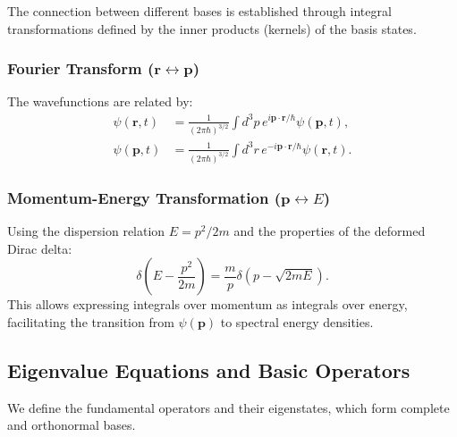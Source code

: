 The connection between different bases is established through integral transformations defined by the inner products (kernels) of the basis states.

\subsubsection{Fourier Transform ($\mathbf{r} \leftrightarrow \mathbf{p}$)}
The wavefunctions are related by:
\begin{align}
    \psi(\mathbf{r},t) &= \frac{1}{(2\pi\hbar)^{3/2}} \int d^3p \, e^{i\mathbf{p}\cdot\mathbf{r}/\hbar} \psi(\mathbf{p},t), \\
    \psi(\mathbf{p},t) &= \frac{1}{(2\pi\hbar)^{3/2}} \int d^3r \, e^{-i\mathbf{p}\cdot\mathbf{r}/\hbar} \psi(\mathbf{r},t).
\end{align}

\subsubsection{Momentum-Energy Transformation ($\mathbf{p} \leftrightarrow E$)}
Using the dispersion relation $E = p^2/2m$ and the properties of the deformed Dirac delta:
\begin{equation}
    \delta\left(E - \frac{p^2}{2m}\right) = \frac{m}{p}\delta(p - \sqrt{2mE}).
\end{equation}
This allows expressing integrals over momentum as integrals over energy, facilitating the transition from $\psi(\mathbf{p})$ to spectral energy densities.

\subsection{Eigenvalue Equations and Basic Operators}

We define the fundamental operators and their eigenstates, which form complete and orthonormal bases.

